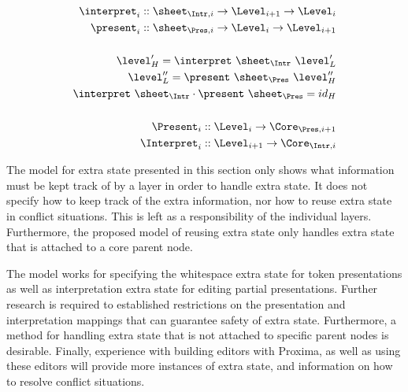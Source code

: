 \begin{small}\begin{align*}%
\interpret_{i} :: \sheet_{\Intr,i} \rightarrow \Level_{i+1} \rightarrow \Level_{i}\\
\present_{i} :: \sheet_{\Pres,i}  \rightarrow  \Level_{i} \rightarrow \Level_{i+1}\\
\\
\level'_{H} = \interpret~\sheet_{\Intr}~\level'_{L}\\
\level''_{L} = \present~\sheet_{\Pres}~\level''_{H}\\
\interpret~\sheet_{\Intr}  \cdot \present~\sheet_{\Pres} = id_{H}\\
\\
\Present_{i} :: \Level_{i} \rightarrow \Core_{\Pres,i+1}\\
\Interpret_{i} :: \Level_{i+1} \rightarrow \Core_{\Intr,i}\\
\end{align*} 
\end{small}
\center{()}
\ec


The model for extra state presented in this section only shows what information must be kept track of by a layer in order to handle extra state. It does not specify how to keep track of the extra information, nor how to reuse extra state in conflict situations. This is left as a responsibility of the individual layers. Furthermore, the proposed model of reusing extra state only handles extra state that is attached to a core parent node.  

The model works for specifying the whitespace extra state for token presentations as well as interpretation extra state for editing partial presentations. Further research is required to established restrictions on the presentation and interpretation mappings that can guarantee safety of extra state. Furthermore, a method for handling extra state that is not attached to specific parent nodes is desirable.  Finally, experience with building editors with Proxima, as well as using these editors will provide more instances of extra state, and information on how to resolve conflict situations.

